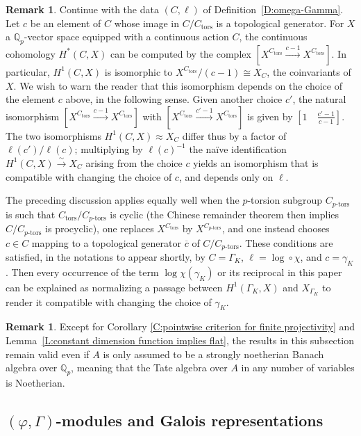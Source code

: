 \documentclass[12pt]{article}
\theoremstyle{definition}
\newtheorem{remark}[theorem]{Remark}
\numberwithin{equation}{theorem}
\newcommand{\QQ}{\mathbb{Q}}
\def\Qp{\QQ_p}
\newcommand{\tors}{\mathrm{tors}}
\newcommand{\ptors}{{p\text{-tors}}}
\begin{document}
\begin{remark}\label{R:normalizations}
Continue with the data $(C, \ell)$ of Definition~\ref{D:omega-Gamma}.
Let $c$ be an element of $C$ whose image in $C/C_\tors$ is a
topological generator.  For $X$ a $\Qp$-vector space equipped with a
continuous action $C$, the continuous cohomology $H^*(C, X)$ can be
computed by the complex $[X^{C_\tors} \xrightarrow{c-1} X^{C_\tors}]$.
In particular, $H^1(C, X)$ is isomorphic to $X^{C_\tors} / (c-1) \cong
X_C$, the coinvariants of $X$.  We wish to warn the reader that this
isomorphism depends on the choice of the element $c$ above, in the
following sense.  Given another choice $c'$, the natural isomorphism
$[X^{C_\tors} \xrightarrow{c-1} X^{C_\tors}]$ with $[X^{C_\tors}
  \xrightarrow{c'-1} X^{C_\tors}]$ is given by $[1 \quad
  \frac{c'-1}{c-1}]$.  The two isomorphisms $H^1(C, X) \approx X_C$
differ thus by a factor of $\ell(c')/\ell(c)$; multiplying by
$\ell(c)^{-1}$ the na\"ive identification $H^1(C,X) \stackrel\sim\to
X_C$ arising from the choice $c$ yields an isomorphism that is
compatible with changing the choice of $c$, and depends only on
$\ell$.

The preceding discussion applies equally well when the $p$-torsion
subgroup $C_\ptors$ is such that $C_\tors/C_\ptors$ is cyclic (the
Chinese remainder theorem then implies $C/C_\ptors$ is procyclic), one
replaces $X^{C_\tors}$ by $X^{C_\ptors}$, and one instead chooses $c
\in C$ mapping to a topological generator $\overline c$ of
$C/C_\ptors$.  These conditions are satisfied, in the notations to
appear shortly, by $C = \Gamma_K$, $\ell = \log \circ \chi$, and $c =
\gamma_K$.  Then every occurrence of the term $\log\chi(\gamma_K)$ or
its reciprocal in this paper can be explained as normalizing a passage
between $H^1(\Gamma_K,X)$ and $X_{\Gamma_K}$ to render it compatible
with changing the choice of $\gamma_K$.
\end{remark}

\begin{remark}
Except for Corollary \ref{C:pointwise criterion for finite projectivity} and Lemma~\ref{L:constant dimension function implies flat}, the results in this subsection remain valid even if $A$ is only assumed to be a strongly noetherian Banach algebra over $\Qp$, meaning that the Tate algebra over $A$ in any number of variables is Noetherian.
\end{remark}


\subsection{$(\varphi, \Gamma)$-modules and Galois representations}
\end{document}
